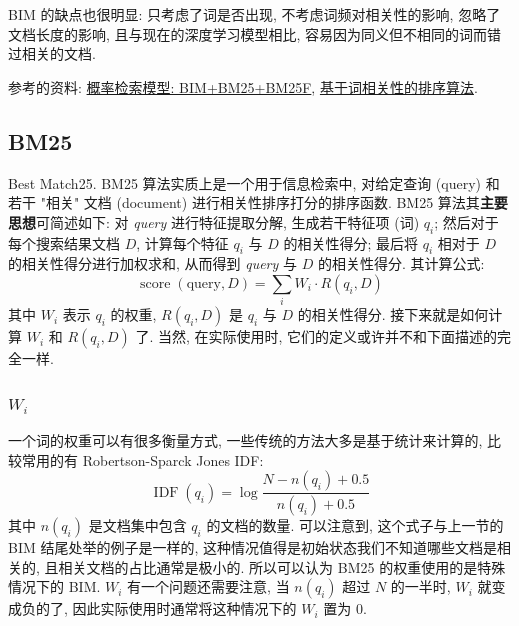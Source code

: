 BIM 的缺点也很明显: 只考虑了词是否出现, 不考虑词频对相关性的影响, 忽略了文档长度的影响, 且与现在的深度学习模型相比, 容易因为同义但不相同的词而错过相关的文档.

参考的资料: \href{https://www.cnblogs.com/bentuwuying/p/6730891.html}{概率检索模型: BIM+BM25+BM25F}, \href{https://blog.csdn.net/SrdLaplace/article/details/84954920}{基于词相关性的排序算法}.

\subsection{BM25}
Best Match25. BM25 算法实质上是一个用于信息检索中, 对给定查询 (query) 和若干 "相关" 文档 (document) 进行相关性排序打分的排序函数. BM25 算法其\textbf{主要思想}可简述如下: 对 \textit{query} 进行特征提取分解, 生成若干特征项 (词) $q_i$; 然后对于每个搜索结果文档 $D$, 计算每个特征 $q_i$ 与 $D$ 的相关性得分; 最后将 $q_i$ 相对于 $D$ 的相关性得分进行加权求和, 从而得到 \textit{query} 与 $D$ 的相关性得分. 其计算公式:
$$
\operatorname{score}(\text{query}, D)=\sum_{i} W_{i} \cdot R\left(q_{i}, D\right)
$$
其中 $W_i$ 表示 $q_i$ 的权重, $R(q_i, D)$ 是 $q_i$ 与 $D$ 的相关性得分. 接下来就是如何计算 $W_i$ 和 $R(q_i, D)$ 了. 当然, 在实际使用时, 它们的定义或许并不和下面描述的完全一样.

\subsubsection{$W_i$}
一个词的权重可以有很多衡量方式, 一些传统的方法大多是基于统计来计算的, 比较常用的有 Robertson-Sparck Jones IDF:
$$
\operatorname{IDF}\left(q_{i}\right)=\log \frac{N-n\left(q_{i}\right)+0.5}{n\left(q_{i}\right)+0.5}
$$
其中 $n(q_i)$ 是文档集中包含 $q_i$ 的文档的数量. 可以注意到, 这个式子与上一节的 BIM 结尾处举的例子是一样的, 这种情况值得是初始状态我们不知道哪些文档是相关的, 且相关文档的占比通常是极小的. 所以可以认为 BM25 的权重使用的是特殊情况下的 BIM. $W_i$ 有一个问题还需要注意, 当 $n(q_i)$ 超过 $N$ 的一半时, $W_i$ 就变成负的了, 因此实际使用时通常将这种情况下的 $W_i$ 置为 0.


